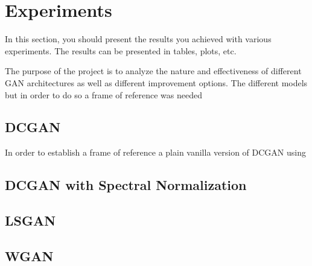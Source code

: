 
\section{Experiments} In this section, you should
present the results you achieved with various experiments. The results
can be presented in tables, plots, etc. 

The purpose of the project is to analyze the nature and effectiveness of different GAN architectures as well as different improvement options. The different models  but in order to do so a frame of reference was needed 

\subsection{DCGAN}
In order to establish a frame of reference a plain vanilla version of DCGAN using 

\subsection{DCGAN with Spectral Normalization}

\subsection{LSGAN}

\subsection{WGAN}